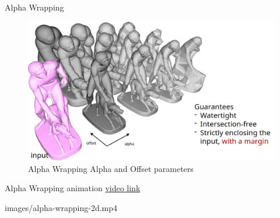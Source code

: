 \documentclass[10pt]{beamer}
\begin{document}
\begin{frame}{Alpha Wrapping}
  \Large
  \begin{figure}[H]
    \centering
    \includegraphics[width=1.1\textwidth]{images/alpha-wrapping_alpha_offset.jpg}
    \caption{Alpha Wrapping Alpha and Offset parameters}
\end{figure}
\end{frame}

\begin{frame}{Alpha Wrapping animation}
  \Large
  \href{https://youtu.be/xIIDolWCrgU}{video link}
  \begin{center}
    \movie[width=1\textwidth,height=0.8\textheight,poster,showcontrols]{}
    {images/alpha-wrapping-2d.mp4}
\end{center}
\end{frame}
\end{document}
